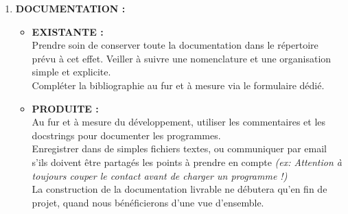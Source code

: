 \begin{adjustwidth}{1cm}{0.5cm}
{{\begin{enumerate}
		\item \textbf{DOCUMENTATION :}
		\begin{itemize}
			\item \textbf{EXISTANTE :}\\
			Prendre soin de conserver toute la documentation dans le répertoire prévu à cet effet. Veiller à suivre une nomenclature et une organisation simple et explicite.\\
			Compléter la bibliographie au fur et à mesure via le formulaire dédié.\\
			\item \textbf{PRODUITE :}\\
			Au fur et à mesure du développement, utiliser les commentaires et les docstrings pour documenter les programmes.\\
			Enregistrer dans de simples fichiers textes, ou communiquer par email s'ils doivent être partagés les points à prendre en compte \textit{(ex: Attention à toujours couper le contact avant de charger un programme !)}\\
			La construction de la documentation livrable ne débutera qu'en fin de projet, quand nous bénéficierons d'une vue d'ensemble.\\
		\end{itemize}
	\end{enumerate}}}
\end{adjustwidth}